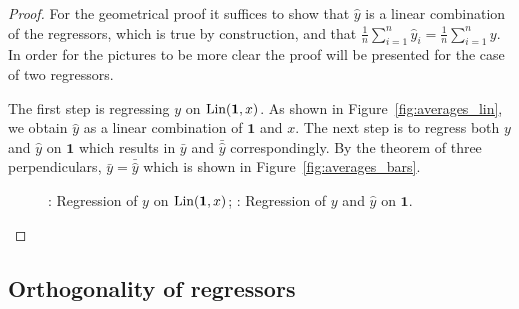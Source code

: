 \begin{proof}
For the geometrical proof it suffices to show that $\hat y$ is a linear combination of the regressors, which is true by construction,
and that $\frac{1}{n} \sum_{i=1}^{n} \hat y_i = \frac{1}{n} \sum_{i=1}^{n} y$. In order for the pictures to be more clear the proof will be presented for the case of two regressors.

The first step is regressing $y$ on $\operatorname{Lin}(\mathbf{1}, x)$. As shown in Figure~\ref{fig:averages_lin}, we obtain $\hat y$ as a linear combination of $\mathbf{1}$ and $x$.
The next step is to regress both $y$ and $\hat y$ on $\mathbf{1}$ which results in $\bar y$ and $\bar{\hat y}$ correspondingly.
By the theorem of three perpendiculars, $\bar y = \bar{\hat y}$ which is shown in Figure~\ref{fig:averages_bars}.

\begin{figure}[ht!]
\begin{center}
\hspace{4ex}
\caption{: Regression of $y$ on $\operatorname{Lin}(\mathbf{1},x)$;
: Regression of $y$ and $\hat y$ on $\mathbf{1}$.}
\end{center}
\end{figure}
\end{proof}


\subsection{Orthogonality of regressors}

